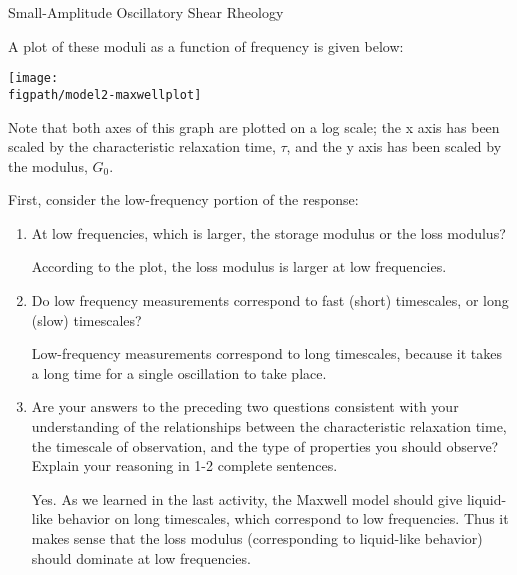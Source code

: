 \begin{activity}[extension]{Small-Amplitude Oscillatory Shear Rheology}
\begin{model}
	A plot of these moduli as a function of frequency is given below:
			
		\vspace{0.1in}	
		\centerline{\texttt{[image: \\figpath/model2-maxwellplot]}}
	
	Note that both axes of this graph are plotted on a log scale; the x axis has been scaled by the characteristic relaxation time, $\tau$, and the y axis has been scaled by the modulus, $G_0$.
	
\end{model}

\begin{ctqs}
	
	\question First, consider the low-frequency portion of the response:
	
		\begin{enumerate}
		
			\item  At low frequencies, which is larger, the storage modulus or the loss modulus?
	
					\begin{solution}[1in]
					
						According to the plot, the loss modulus is larger at low frequencies.
					
					\end{solution}
					
			\item Do low frequency measurements correspond to fast (short) timescales, or long (slow) timescales?
			
				\begin{solution}[1in]
				
					Low-frequency measurements correspond to long timescales, because it takes a long time for a single oscillation to take place.
				
				\end{solution}
					
			\item Are your answers to the preceding two questions consistent with your understanding of the relationships between the characteristic relaxation time, the timescale of observation, and the type of properties you should observe?  Explain your reasoning in 1-2 complete sentences.
			
				\begin{solution}[2in]
				
					Yes. As we learned in the last activity, the Maxwell model should give liquid-like behavior on long timescales, which correspond to low frequencies.  Thus it makes sense that the loss modulus (corresponding to liquid-like behavior) should dominate at low frequencies.
				

\end{solution}
\end{enumerate}
\end{ctqs}
\end{activity}
